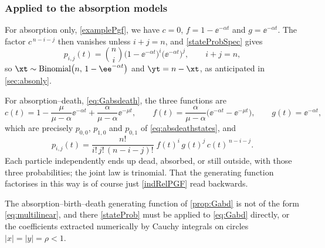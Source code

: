 \subsubsection*{Applied to the absorption models}

For absorption only, \cref{examplePgf}, we have $c=0$, $f = 1-\ee^{-\alpha t}$ and
$g = \ee^{-\alpha t}$. The factor $c^{\,n-i-j}$ then vanishes unless $i+j=n$, and
\cref{stateProbSpec} gives
\begin{equation*}
p_{i,j}(t) = \binom{n}{i}\bigl(1-\ee^{-\alpha t}\bigr)^{i}\bigl(\ee^{-\alpha t}\bigr)^{j},
\qquad i+j = n,
\end{equation*}
so $\xt\sim\text{Binomial}\bigl(n,\,1-\ee^{-\alpha t}\bigr)$ and $\yt = n-\xt$, as
anticipated in \cref{sec:absonly}.

For absorption--death, \cref{eq:Gabsdeath}, the three functions are
\begin{equation*}
c(t) = 1-\frac{\mu}{\mu-\alpha}\ee^{-\alpha t} + \frac{\alpha}{\mu-\alpha}\ee^{-\mu t},
\qquad
f(t) = \frac{\alpha}{\mu-\alpha}\bigl(\ee^{-\alpha t}-\ee^{-\mu t}\bigr),
\qquad
g(t) = \ee^{-\alpha t},
\end{equation*}
which are precisely $p_{0,0}$, $p_{1,0}$ and $p_{0,1}$ of \cref{eq:absdeathstates}, and
\begin{equation*}
p_{i,j}(t) = \frac{n!}{i!\,j!\,(n-i-j)!}\;f(t)^{i}\,g(t)^{j}\,c(t)^{\,n-i-j}.
\end{equation*}
Each particle independently ends up dead, absorbed, or still outside, with those three
probabilities; the joint law is trinomial. That the generating function factorises in
this way is of course just \cref{indRelPGF} read backwards.

The absorption--birth--death generating function of \cref{prop:Gabd} is not of the form
\cref{eq:multilinear}, and there \cref{stateProb} must be applied to \cref{eq:Gabd}
directly, or the coefficients extracted numerically by Cauchy integrals on circles
$|x|=|y|=\rho<1$.
